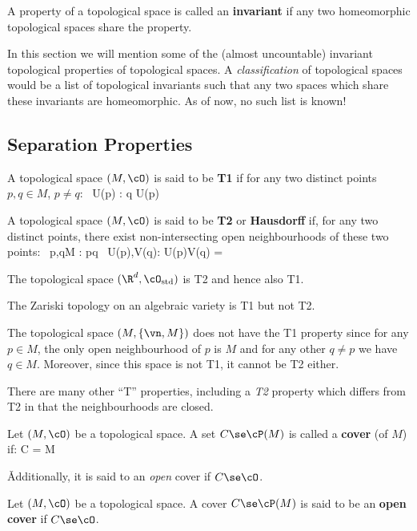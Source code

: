 A property of a topological space is called an \textbf{invariant} if any two homeomorphic topological spaces share
the property.
\ed

In this section we will mention some of the (almost uncountable) invariant topological properties of topological
spaces. A \emph{classification} of topological spaces would be a list of topological invariants such that any two
spaces which share these invariants are homeomorphic. As of now, no such list is known!

\subsection{Separation Properties}

A topological space $(M,\cO)$ is said to be \textbf{T1} if for any two distinct points $p,q\in M$, $p\neq q$:
\bse
\exists \, U(p) \in \cO : q \notin U(p)
\ese
\ed

A topological space $(M,\cO)$ is said to be \textbf{T2} or \textbf{Hausdorff} if, for any two distinct points, there
exist non-intersecting open neighbourhoods of these two points:
\bse
\forall \, p,q\in M : p\neq q \imp \exists \, U(p),V(q)\in \cO : U(p)\cap V(q) = \vn
\ese
\ed

\be
The topological space $(\R^d,\cO_\mathrm{std})$ is T2 and hence also T1.
\ee

\be
The Zariski topology on an algebraic variety is T1 but not T2.
\ee

\be
The topological space $(M,\{\vn,M\})$ does not have the T1 property since for any $p \in M$, the only open
neighbourhood of $p$ is $M$ and for any other $q\neq p$ we have $q\in M$. Moreover, since this space is not T1, it
cannot be T2 either.
\ee

There are many other ``T'' properties, including a \emph{T2} property which differs from T2 in that the
neighbourhoods are closed.

\bd [Cover]
Let $(M,\cO)$ be a topological space. A set $C \se \cP(M)$ is called a \textbf{cover} (of $M$) if:
\bse
\bigcup C = M
\ese

\v

Additionally, it is said to an \emph{open} cover if $C \se \cO$.
\ed

Let $(M,\cO)$ be a topological space. A cover $C \se \cP(M)$ is said to be an \textbf{open cover} if $C \se \cO$.
\ed

